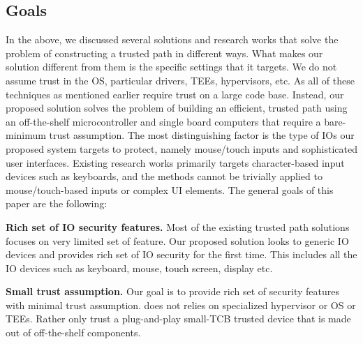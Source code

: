 \subsection{Goals}

In the above, we discussed several solutions and research works that solve the problem of constructing a trusted path in different ways. What makes our solution different from them is the specific settings that it targets. We do not assume trust in the OS, particular drivers, TEEs, hypervisors, etc. As all of these techniques as mentioned earlier require trust on a large code base. Instead, our proposed solution solves the problem of building an efficient, trusted path using an off-the-shelf microcontroller and single board computers that require a bare-minimum trust assumption. The most distinguishing factor is the type of IOs our proposed system targets to protect, namely mouse/touch inputs and sophisticated user interfaces. Existing research works primarily targets character-based input devices such as keyboards, and the methods cannot be trivially applied to mouse/touch-based inputs or complex UI elements. The general goals of this paper are the following:

\begin{mylist}
  \item  \textbf{Rich set of IO security features.} Most of the existing trusted path solutions focuses on very limited set of feature. Our proposed solution \name looks to generic IO devices and provides rich set of IO security for the first time. This includes all the IO devices such as keyboard, mouse, touch screen, display etc.
  
  
  \item  \textbf{Small trust assumption.} Our goal is to provide rich set of security features with minimal trust assumption. \name does not relies on specialized hypervisor or OS or TEEs. Rather \name only trust a plug-and-play small-TCB trusted device that is made out of off-the-shelf components.  
  
\end{mylist}


